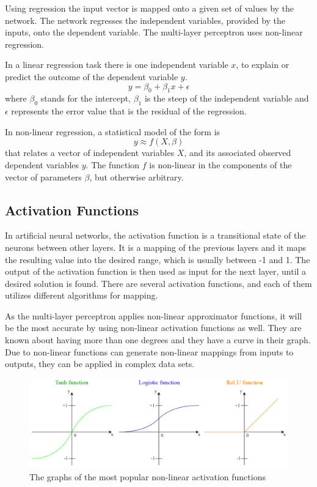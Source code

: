 Using regression the input vector is mapped onto a given set of values by the network. The network regresses the independent variables, provided by the inputs, onto the dependent variable. The multi-layer perceptron uses non-linear regression.  \medskip

In a linear regression task there is one independent variable $x$, to explain or predict the outcome of the dependent variable $y$.
$$ y = \beta_0 + \beta_1x + \epsilon $$
where $\beta_0$ stands for the intercept, $\beta_1$ is the steep of the independent variable and $\epsilon$ represents the error value that is the residual of the regression. \medskip

In non-linear regression, a statistical model of the form is
$$ y \approx f(X,\beta) $$
that relates a vector of independent variables $X$, and its associated observed dependent variables $y$. The function $f$ is non-linear in the components of the vector of parameters $\beta$, but otherwise arbitrary. 



\subsection{Activation Functions}

In artificial neural networks, the activation function is a transitional state of the neurons between other layers. It is a mapping of the previous layers and it maps the resulting value into the desired range, which is usually between -1 and 1. The output of the activation function is then used as input for the next layer, until a desired solution is found. There are several activation functions, and each of them utilizes different algorithms for mapping. \smallskip

As the multi-layer perceptron applies non-linear approximator functions, it will be the most accurate by using non-linear activation functions as well. They are known about having more than one degrees and they have a curve in their graph. Due to non-linear functions can generate non-linear mappings from inputs to outputs, they can be applied in complex data sets. 

\begin{figure}[h]
	\centering
	\includegraphics[height=0.35\linewidth]{./figures/functions}
	\caption{The graphs of the most popular non-linear activation functions}
	\label{fig:functions}
\end{figure}

